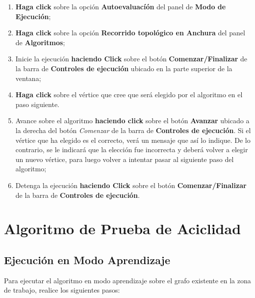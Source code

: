 \documentclass{book}
\begin{document}
\begin{enumerate}
	\itemsep=8pt \topsep=0pt \partopsep=0pt \parskip=0pt \parsep=0pt

	\item \textbf{Haga click} sobre la opción \textbf{Autoevaluacíón} del panel de \textbf{Modo de Ejecución};

	\item \textbf{Haga click} sobre la opción \textbf{Recorrido topológico en Anchura} del panel de \textbf{Algoritmos};

	\item Inicie la ejecución \textbf{haciendo Click} sobre el botón \textbf{Comenzar/Finalizar} de la barra de \textbf{Controles de ejecución} ubicado en la parte superior de la ventana;

	\item \textbf{Haga click} sobre el vértice que cree que será elegido por el algoritmo en el paso siguiente.

	\item Avance sobre el algoritmo \textbf{haciendo click} sobre el botón \textbf{Avanzar} ubicado a la derecha del botón \textit{Comenzar} de la barra de \textbf{Controles de ejecución}. Si el vértice que ha elegido es el correcto, verá un mensaje que así lo indique. De lo contrario, se le indicará que la elección fue incorrecta y deberá volver a elegir un nuevo vértice, para luego volver a intentar pasar al siguiente paso del algoritmo;

	\item Detenga la ejecución \textbf{haciendo Click} sobre el botón \textbf{Comenzar/Finalizar} de la barra de \textbf{Controles de ejecución}.

\end{enumerate}
\medskip





%
%
\chapter{Algoritmo de Prueba de Aciclidad}


\section{Ejecución en Modo Aprendizaje}

Para ejecutar el algoritmo en modo aprendizaje sobre el grafo existente en la zona de trabajo, realice los siguientes pasos:
\medskip
\end{document}
